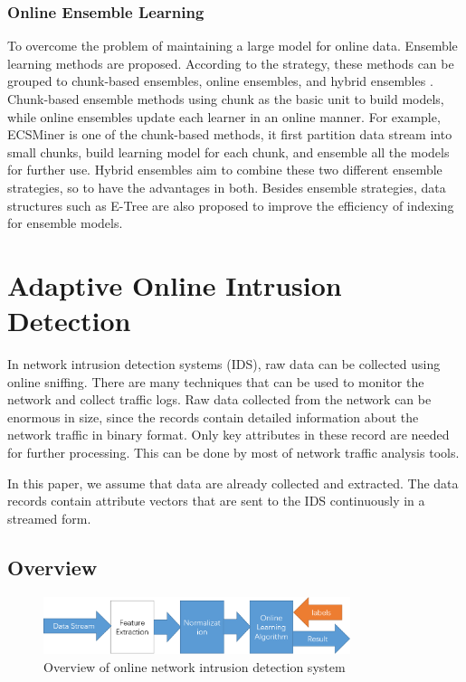 \documentclass[runningheads]{llncs}
\begin{document}
	\subsubsection{Online Ensemble Learning}
	
	To overcome the problem of maintaining a large model for online data. Ensemble learning methods are proposed. According to the strategy, these methods can be grouped to chunk-based ensembles, online ensembles, and hybrid ensembles \cite{Sun2016}. Chunk-based ensemble methods using chunk as the basic unit to build models, while online ensembles update each learner in an online manner. For example, ECSMiner\cite{Masud2011} is one of the chunk-based methods, it first partition data stream into small chunks, build learning model for each chunk, and ensemble all the models for further use. Hybrid ensembles aim to combine these two different ensemble strategies, so to have the advantages in both. Besides ensemble strategies, data structures such as E-Tree \cite{Zhang2015} are also proposed to improve the efficiency of indexing for ensemble models. 

	\section{Adaptive Online Intrusion Detection} \label{Our Method}
	
	In network intrusion detection systems (IDS), raw data can be collected using online sniffing. There are many techniques that can be used to monitor the network and collect traffic logs. Raw data collected from the network can be enormous in size, since the records contain detailed information about the network traffic in binary format. Only key attributes in these record are needed for further processing. This can be done by most of network traffic analysis tools.

	In this paper, we assume that data are already collected and extracted. The data records contain attribute vectors that are sent to the IDS continuously in a streamed form.

	\subsection{Overview}
	
	\begin{figure}
		\centering
		\includegraphics[width=0.8\textwidth]{overview}
		\caption{Overview of online network intrusion detection system}
		\label{fig:overview}
	\end{figure}
	
\end{document}

